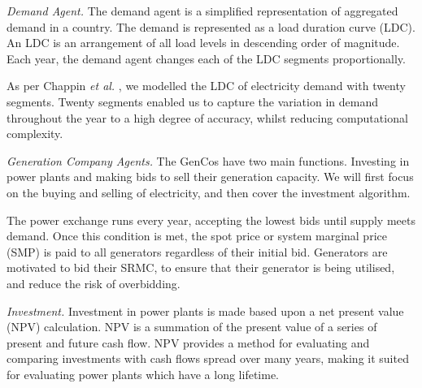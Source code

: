 \textit{Demand Agent.} The demand agent is a simplified representation of aggregated demand in a country. The demand is represented as a load duration curve (LDC).  An LDC is an arrangement of all load levels in descending order of magnitude.  Each year, the demand agent changes each of the LDC segments proportionally.


As per Chappin \textit{et al.} \cite{Chappin2017}, we modelled the LDC of electricity demand with twenty segments. Twenty segments enabled us to capture the variation in demand throughout the year to a high degree of accuracy, whilst reducing computational complexity. 


\textit{Generation Company Agents.} The GenCos have two main functions. Investing in power plants and making bids to sell their generation capacity. We will first focus on the buying and selling of electricity, and then cover the investment algorithm.

The power exchange runs every year, accepting the lowest bids until supply meets demand. Once this condition is met, the spot price or system marginal price (SMP) is paid to all generators regardless of their initial bid. Generators are motivated to bid their SRMC, to ensure that their generator is being utilised, and reduce the risk of overbidding.

\textit{Investment.} Investment in power plants is made based upon a net present value (NPV) calculation. NPV is a summation of the present value of a series of present and future cash flow. NPV provides a method for evaluating and comparing investments with cash flows spread over many years, making it suited for evaluating power plants which have a long lifetime.  

